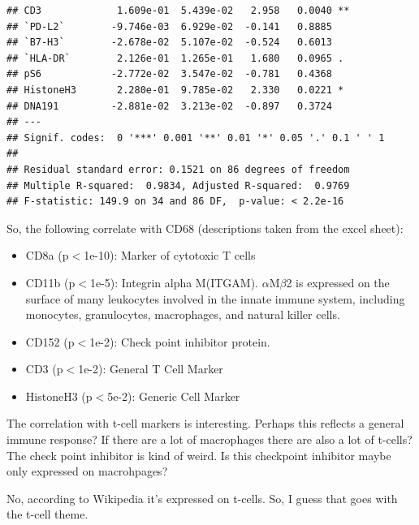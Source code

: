 \documentclass[a4paper]{article}\usepackage[]{graphicx}\usepackage[]{color}
\makeatletter
\newenvironment{kframe}{%
 \def\at@end@of@kframe{}%
 \ifinner\ifhmode%
  \def\at@end@of@kframe{\end{minipage}}%
  \begin{minipage}{\columnwidth}%
 \fi\fi%
 \def\FrameCommand##1{\hskip\@totalleftmargin \hskip-\fboxsep
 \colorbox{shadecolor}{##1}\hskip-\fboxsep
     \hskip-\linewidth \hskip-\@totalleftmargin \hskip\columnwidth}%
 \MakeFramed {\advance\hsize-\width
   \@totalleftmargin\z@ \linewidth\hsize
   \@setminipage}}%
 {\par\unskip\endMakeFramed%
 \at@end@of@kframe}
\newenvironment{knitrout}{}{} %
\makeatother
\begin{document}
\begin{knitrout}
\begin{kframe}
\begin{verbatim}
## CD3             1.609e-01  5.439e-02   2.958   0.0040 ** 
## `PD-L2`        -9.746e-03  6.929e-02  -0.141   0.8885    
## `B7-H3`        -2.678e-02  5.107e-02  -0.524   0.6013    
## `HLA-DR`        2.126e-01  1.265e-01   1.680   0.0965 .  
## pS6            -2.772e-02  3.547e-02  -0.781   0.4368    
## HistoneH3       2.280e-01  9.785e-02   2.330   0.0221 *  
## DNA191         -2.881e-02  3.213e-02  -0.897   0.3724    
## ---
## Signif. codes:  0 '***' 0.001 '**' 0.01 '*' 0.05 '.' 0.1 ' ' 1
## 
## Residual standard error: 0.1521 on 86 degrees of freedom
## Multiple R-squared:  0.9834,	Adjusted R-squared:  0.9769 
## F-statistic: 149.9 on 34 and 86 DF,  p-value: < 2.2e-16
\end{verbatim}
\end{kframe}
\end{knitrout}

So, the following correlate with CD68 (descriptions taken from the excel sheet):
\begin{itemize}
  \item CD8a (p$<$1e-10): Marker of cytotoxic T cells
  \item CD11b (p$<$1e-5): Integrin alpha M(ITGAM). $\alpha$M$\beta$2 is expressed on the surface of many leukocytes involved in the innate immune system, including monocytes, granulocytes, macrophages, and natural killer cells.
  \item CD152 (p$<$1e-2): Check point inhibitor protein.
  \item CD3 (p$<$1e-2): General T Cell Marker
  \item HistoneH3 (p$<$5e-2): Generic Cell Marker
\end{itemize}

The correlation with t-cell markers is interesting. Perhaps this reflects a general immune response? If there are a lot of macrophages there are also a lot of t-cells? The check point inhibitor is kind of weird. Is this checkpoint inhibitor maybe only expressed on macrohpages?

No, according to Wikipedia it's expressed on t-cells. So, I guess that goes with the t-cell theme.
\end{document}
